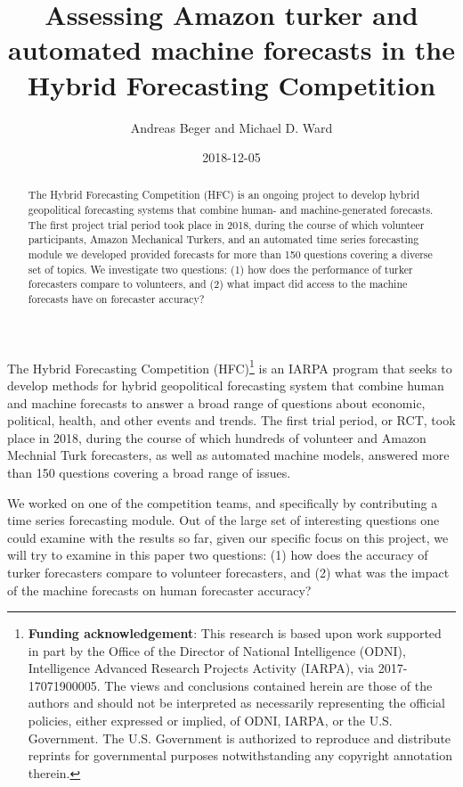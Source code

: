 \documentclass[]{article}
\title{Assessing Amazon turker and automated machine forecasts in the Hybrid
Forecasting Competition}
\author{Andreas Beger and Michael D. Ward}
\date{2018-12-05}
\let\rmarkdownfootnote\footnote%
\def\footnote{\protect\rmarkdownfootnote}
\begin{document}
\maketitle
\begin{abstract}
\noindent The Hybrid Forecasting Competition (HFC) is an ongoing project
to develop hybrid geopolitical forecasting systems that combine human-
and machine-generated forecasts. The first project trial period took
place in 2018, during the course of which volunteer participants, Amazon
Mechanical Turkers, and an automated time series forecasting module we
developed provided forecasts for more than 150 questions covering a
diverse set of topics. We investigate two questions: (1) how does the
performance of turker forecasters compare to volunteers, and (2) what
impact did access to the machine forecasts have on forecaster accuracy?
\newline \newline
\end{abstract}

The Hybrid Forecasting Competition (HFC)\footnote{\textbf{Funding
  acknowledgement}: This research is based upon work supported in part
  by the Office of the Director of National Intelligence (ODNI),
  Intelligence Advanced Research Projects Activity (IARPA), via
  2017-17071900005. The views and conclusions contained herein are those
  of the authors and should not be interpreted as necessarily
  representing the official policies, either expressed or implied, of
  ODNI, IARPA, or the U.S. Government. The U.S. Government is authorized
  to reproduce and distribute reprints for governmental purposes
  notwithstanding any copyright annotation therein.} is an IARPA program
that seeks to develop methods for hybrid geopolitical forecasting system
that combine human and machine forecasts to answer a broad range of
questions about economic, political, health, and other events and
trends. The first trial period, or RCT, took place in 2018, during the
course of which hundreds of volunteer and Amazon Mechnial Turk
forecasters, as well as automated machine models, answered more than 150
questions covering a broad range of issues.

We worked on one of the competition teams, and specifically by
contributing a time series forecasting module. Out of the large set of
interesting questions one could examine with the results so far, given
our specific focus on this project, we will try to examine in this paper
two questions: (1) how does the accuracy of turker forecasters compare
to volunteer forecasters, and (2) what was the impact of the machine
forecasts on human forecaster accuracy?
\end{document}
